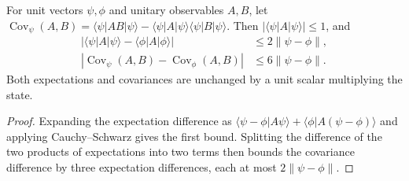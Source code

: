 \begin{lemma}
    \label{thm:ldp_covariance_stability}
    \leanok
    For unit vectors $\psi,\phi$ and unitary observables $A,B$, let
    $\operatorname{Cov}_\psi(A,B)=
        \langle\psi|AB|\psi\rangle-
        \langle\psi|A|\psi\rangle\langle\psi|B|\psi\rangle$.
    Then $|\langle\psi|A|\psi\rangle|\le1$, and
    \begin{align}
        |\langle\psi|A|\psi\rangle-
        \langle\phi|A|\phi\rangle| & \le2\|\psi-\phi\|, \\
        |\operatorname{Cov}_\psi(A,B)-\operatorname{Cov}_\phi(A,B)|
                                   & \le6\|\psi-\phi\|.
    \end{align}
    Both expectations and covariances are unchanged by a unit scalar
    multiplying the state.
\end{lemma}
\begin{proof}
    \leanok
    Expanding the expectation difference as
    $\langle\psi-\phi|A\psi\rangle+
        \langle\phi|A(\psi-\phi)\rangle$ and applying Cauchy--Schwarz
    gives the first bound. Splitting the difference of the two products
    of expectations into two terms then bounds the covariance difference
    by three expectation differences, each at most $2\|\psi-\phi\|$.
\end{proof}

